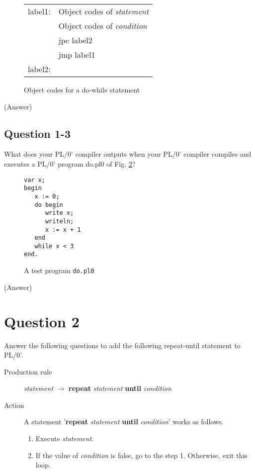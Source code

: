 \documentclass{article}
\begin{document}
\begin{figure}[h]
\begin{tabular}{ll}
label1: & Object codes of {\it statement} \\
        & Object codes of {\it condition} \\
        & jpc label2 \\
        & jmp label1 \\
label2: & \\
\end{tabular}
\caption{Object codes for a do-while statement}
\label{fig:dowhile-code}
\end{figure}

\ifreport
(Answer)\\
\fi




\subsection*{Question 1-3}
What does your PL/0' compiler outputs when your PL/0' compiler compiles
and executes a PL/0' program do.pl0 of Fig. \ref{fig:do-while}?

\begin{figure}[h]
\begin{verbatim}
var x;
begin
   x := 0;
   do begin
      write x;
      writeln;
      x := x + 1
   end
   while x < 3
end.
\end{verbatim}
\caption{A test program {\tt do.pl0}}\label{fig:do-while}
\end{figure}


\ifreport
(Answer)\\
\fi





\newpage
\section*{Question 2}
Answer the following questions to add the following repeat-until statement to PL/0'.

\begin{description}
 \item[Production rule] {\it statement}  $\to$ {\bf repeat} {\it statement} {\bf until} {\it condition}
 \item[Action] A statement '{\bf repeat} {\it statement} {\bf until} {\it condition}' works as follows.
	    \begin{enumerate}
	     \item Execute {\it statement}.
	     \item If the value of {\it condition} is false, go to the step 1. Otherwise, exit this loop.
	    \end{enumerate}
\end{description}
\end{document}
